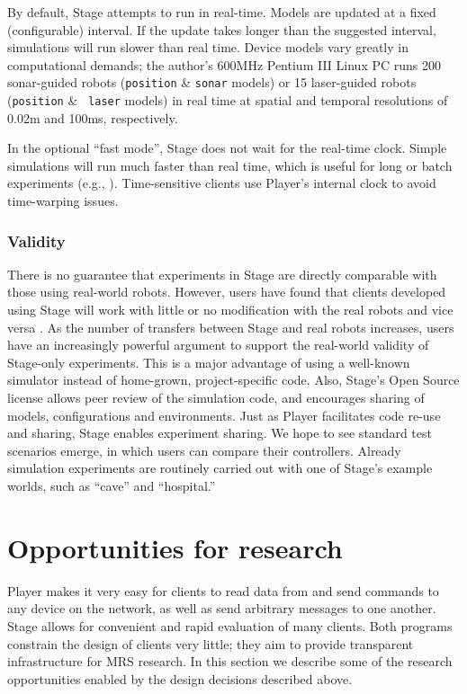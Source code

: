 \documentclass[a4paper]{ICAR2003}
\begin{document}
By default, Stage attempts to run in real-time. Models are updated at
a fixed (configurable) interval.  If the update takes longer than the
suggested interval, simulations will run slower than real time. Device
models vary greatly in computational demands; the author's 600MHz Pentium
III Linux PC runs 200 sonar-guided robots ({\tt position} \& {\tt sonar}
models) or 15 laser-guided robots ({\tt position} \& {\tt
  laser} models) in real time at spatial and temporal resolutions of
  0.02m and 100ms, respectively.

In the optional ``fast mode'', Stage does not wait for the real-time
clock. Simple simulations will run much faster than real time,
which is useful for long or batch experiments (e.g., \cite{Dahl02}).
Time-sensitive clients use Player's internal clock to avoid time-warping
issues.

\subsubsection{Validity}
There is no guarantee that experiments in Stage are directly
comparable with those using real-world robots. However, users
have found that clients developed using Stage will work with
little or no modification with the real robots and vice versa
\cite{JungSukhatme02,MakarenkoWilliamsBourgault02,Vaughan02:LOST-tra}. As
the number of transfers between Stage and real robots increases,
users have an increasingly powerful argument to support the real-world
validity of Stage-only experiments.  This is a major advantage of using a
well-known simulator instead of home-grown, project-specific code.  Also,
Stage's Open Source license allows peer review of the simulation code,
and encourages sharing of models, configurations and environments.
Just as Player facilitates code re-use and sharing, Stage enables
experiment sharing. We hope to see standard test scenarios emerge, in
which users can compare their controllers. Already simulation experiments
are routinely carried out with one of Stage's example worlds, such as
``cave'' and ``hospital.''

\section{Opportunities for research}
\label{sect:opp}

Player makes it very easy for clients to read data from and send
commands to any device on the network, as well as send arbitrary
messages to one another. Stage allows for convenient and rapid
evaluation of many clients. Both programs constrain the design of
clients very little; they aim to provide transparent infrastructure
for MRS research. In this section we describe some of the research
opportunities enabled by the design decisions described above.
\end{document}
